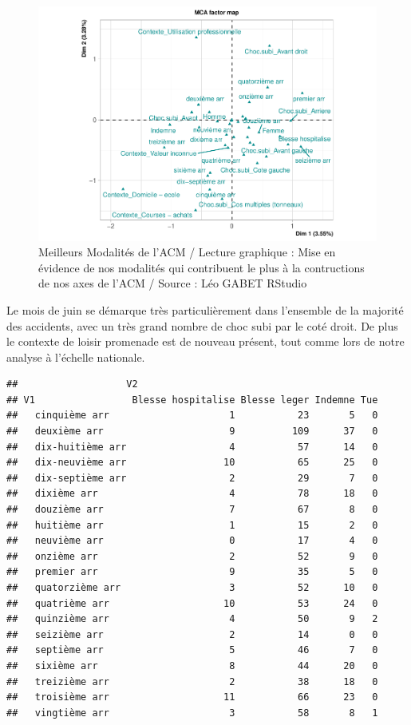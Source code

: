 \documentclass[french,]{compterendu}
\theoremstyle{urcastyle}
\theoremstyle{remark}
\begin{document}
\begin{figure}[H]

{\centering \includegraphics[width=0.9\linewidth]{Rapport_ADD_LEO-GABET_files/figure-latex/acmPARIS-1} 

}

\caption{Meilleurs Modalités de l'ACM / Lecture graphique : Mise en évidence de nos modalités qui contribuent le plus à la contructions de nos axes de l'ACM / Source : Léo GABET RStudio}\label{fig:acmPARIS}
\end{figure}

Le mois de juin se démarque très particulièrement dans l'ensemble de la majorité des accidents, avec un très grand nombre de choc subi par le coté droit. De plus le contexte de loisir promenade est de nouveau présent, tout comme lors de notre analyse à l'échelle nationale.

\begin{verbatim}
##                   V2
## V1                 Blesse hospitalise Blesse leger Indemne Tue
##   cinquième arr                     1           23       5   0
##   deuxième arr                      9          109      37   0
##   dix-huitième arr                  4           57      14   0
##   dix-neuvième arr                 10           65      25   0
##   dix-septième arr                  2           29       7   0
##   dixième arr                       4           78      18   0
##   douzième arr                      7           67       8   0
##   huitième arr                      1           15       2   0
##   neuvième arr                      0           17       4   0
##   onzième arr                       2           52       9   0
##   premier arr                       9           35       5   0
##   quatorzième arr                   3           52      10   0
##   quatrième arr                    10           53      24   0
##   quinzième arr                     4           50       9   2
##   seizième arr                      2           14       0   0
##   septième arr                      5           46       7   0
##   sixième arr                       8           44      20   0
##   treizième arr                     2           38      18   0
##   troisième arr                    11           66      23   0
##   vingtième arr                     3           58       8   1
\end{verbatim}
\end{document}
